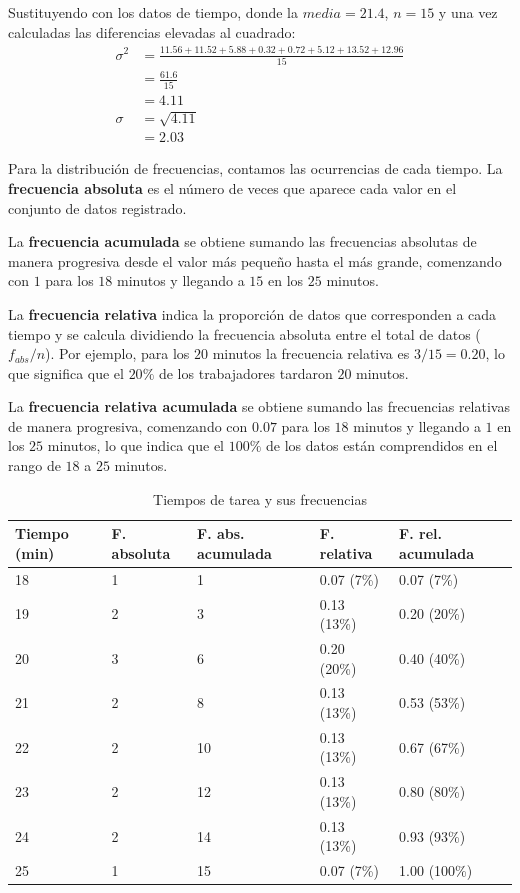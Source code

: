 \documentclass[12pt]{article}
\begin{document}
Sustituyendo con los datos de tiempo, donde la $media = 21.4$, $n = 15$ y una vez calculadas las diferencias elevadas al cuadrado:
\begin{align*}
\sigma^2 &= \frac{11.56 + 11.52 + 5.88 + 0.32 + 0.72 + 5.12 + 13.52 + 12.96}{15} \\
&= \frac{61.6}{15} \\
&= 4.11 \\
\sigma &= \sqrt{4.11}  \\
&= 2.03
\end{align*}

Para la distribución de frecuencias, contamos las ocurrencias de cada tiempo. La \textbf{frecuencia absoluta} es el número de veces que aparece cada valor en el conjunto de datos registrado.

La \textbf{frecuencia acumulada} se obtiene sumando las frecuencias absolutas de manera progresiva desde el valor más pequeño hasta el más grande, comenzando con $1$ para los $18$ minutos y llegando a $15$ en los $25$ minutos.

La \textbf{frecuencia relativa} indica la proporción de datos que corresponden a cada tiempo y se calcula dividiendo la frecuencia absoluta entre el total de datos ($f_{abs}/n$). Por ejemplo, para los $20$ minutos la frecuencia relativa es $3/15 = 0.20$, lo que significa que el $20\%$ de los trabajadores tardaron $20$ minutos.

La \textbf{frecuencia relativa acumulada} se obtiene sumando las frecuencias relativas de manera progresiva, comenzando con $0.07$ para los $18$ minutos y llegando a $1$ en los $25$ minutos, lo que indica que el $100\%$ de los datos están comprendidos en el rango de $18$ a $25$ minutos.

\begin{table}[h!]
    \begin{center}
        \begin{tabular}{|l|l|l|l|l|}
            \hline
            Tiempo (min) & F. absoluta & F. abs. acumulada & F. relativa & F. rel. acumulada \\
            \hline
            18 & 1 &  1 & 0.07 (7\%) & 0.07 (7\%) \\
            19 & 2 &  3 & 0.13 (13\%) & 0.20 (20\%) \\
            20 & 3 &  6 & 0.20 (20\%) & 0.40 (40\%) \\
            21 & 2 &  8 & 0.13 (13\%) & 0.53 (53\%) \\
            22 & 2 & 10 & 0.13 (13\%) & 0.67 (67\%) \\
            23 & 2 & 12 & 0.13 (13\%) & 0.80 (80\%) \\
            24 & 2 & 14 & 0.13 (13\%) & 0.93 (93\%) \\
            25 & 1 & 15 & 0.07 (7\%) & 1.00 (100\%) \\
            \hline
        \end{tabular}
        \caption{Tiempos de tarea y sus frecuencias}
        \label{tab:tabla_tiempos}
    \end{center}
\end{table}
\end{document}
